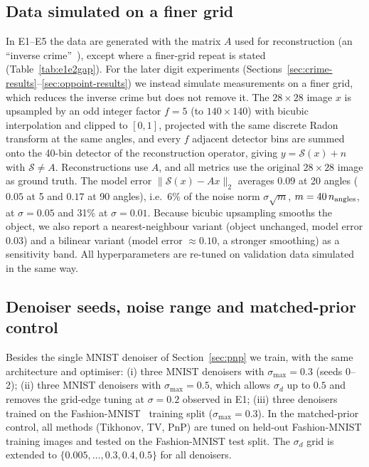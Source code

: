 \subsection{Data simulated on a finer grid}\label{sec:crimefree}
In E1--E5 the data are generated with the matrix $A$ used for reconstruction (an ``inverse crime''~\citep{wirgin2004,kaipio2005}), except where a finer-grid repeat is stated (Table~\ref{tab:e1e2gap}). For the later digit experiments (Sections~\ref{sec:crime-results}--\ref{sec:oppoint-results}) we instead simulate measurements on a finer grid, which reduces the inverse crime but does not remove it. The $28\times28$ image $x$ is upsampled by an odd integer
factor $f=5$ (to $140\times140$) with bicubic interpolation and clipped to $[0,1]$, projected with the same
discrete Radon transform at the same angles, and every $f$ adjacent detector bins are summed onto the 40-bin
detector of the reconstruction operator, giving $y=\mathcal{S}(x)+n$ with $\mathcal{S}\neq A$. Reconstructions use
$A$, and all metrics use the original $28\times28$ image as ground truth. The model error
$\|\mathcal{S}(x)-Ax\|_2$ averages $0.09$ at 20 angles ($0.05$ at 5 and $0.17$ at 90 angles), i.e.\ 6\% of the
noise norm $\sigma\sqrt{m}$, $m=40\,n_{\rm angles}$, at $\sigma=0.05$ and 31\% at $\sigma=0.01$. Because bicubic
upsampling smooths the object, we also report a nearest-neighbour variant (object unchanged, model error $0.03$) and
a bilinear variant (model error $\approx0.10$, a stronger smoothing) as a sensitivity band. All hyperparameters are
re-tuned on validation data simulated in the same way.

\subsection{Denoiser seeds, noise range and matched-prior control}\label{sec:seeds}
Besides the single MNIST denoiser of Section~\ref{sec:pnp} we train, with the same architecture and
optimiser: (i) three MNIST denoisers with $\sigma_{\max}=0.3$ (seeds 0--2);
(ii) three MNIST denoisers with $\sigma_{\max}=0.5$, which allows $\sigma_d$ up to $0.5$ and removes the grid-edge
tuning at $\sigma=0.2$ observed in E1; (iii) three denoisers trained on the Fashion-MNIST~\citep{xiao2017fashion} training split ($\sigma_{\max}=0.3$). In the matched-prior control, all methods (Tikhonov, TV, PnP) are tuned on held-out
Fashion-MNIST training images and tested on the Fashion-MNIST test split. The $\sigma_d$ grid is extended to
$\{0.005,\dots,0.3,0.4,0.5\}$ for all denoisers.

